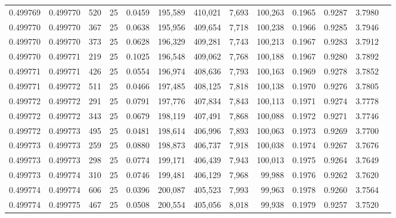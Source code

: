 \begin{tabular}{rrrrrrrrrrrrr}
0.499769 & 0.499770 &   520 &  25 &                                     0.0459 & 195,589 & 410,021 &   7,693 & 100,263 & 0.1965 & 0.9287 & 3.7980 \\
0.499770 & 0.499770 &   367 &  25 &                                     0.0638 & 195,956 & 409,654 &   7,718 & 100,238 & 0.1966 & 0.9285 & 3.7946 \\
0.499770 & 0.499770 &   373 &  25 &                                     0.0628 & 196,329 & 409,281 &   7,743 & 100,213 & 0.1967 & 0.9283 & 3.7912 \\
0.499770 & 0.499771 &   219 &  25 &                                     0.1025 & 196,548 & 409,062 &   7,768 & 100,188 & 0.1967 & 0.9280 & 3.7892 \\
0.499771 & 0.499771 &   426 &  25 &                                     0.0554 & 196,974 & 408,636 &   7,793 & 100,163 & 0.1969 & 0.9278 & 3.7852 \\
0.499771 & 0.499772 &   511 &  25 &                                     0.0466 & 197,485 & 408,125 &   7,818 & 100,138 & 0.1970 & 0.9276 & 3.7805 \\
0.499772 & 0.499772 &   291 &  25 &                                     0.0791 & 197,776 & 407,834 &   7,843 & 100,113 & 0.1971 & 0.9274 & 3.7778 \\
0.499772 & 0.499772 &   343 &  25 &                                     0.0679 & 198,119 & 407,491 &   7,868 & 100,088 & 0.1972 & 0.9271 & 3.7746 \\
0.499772 & 0.499773 &   495 &  25 &                                     0.0481 & 198,614 & 406,996 &   7,893 & 100,063 & 0.1973 & 0.9269 & 3.7700 \\
0.499773 & 0.499773 &   259 &  25 &                                     0.0880 & 198,873 & 406,737 &   7,918 & 100,038 & 0.1974 & 0.9267 & 3.7676 \\
0.499773 & 0.499773 &   298 &  25 &                                     0.0774 & 199,171 & 406,439 &   7,943 & 100,013 & 0.1975 & 0.9264 & 3.7649 \\
0.499773 & 0.499774 &   310 &  25 &                                     0.0746 & 199,481 & 406,129 &   7,968 &  99,988 & 0.1976 & 0.9262 & 3.7620 \\
0.499774 & 0.499774 &   606 &  25 &                                     0.0396 & 200,087 & 405,523 &   7,993 &  99,963 & 0.1978 & 0.9260 & 3.7564 \\
0.499774 & 0.499775 &   467 &  25 &                                     0.0508 & 200,554 & 405,056 &   8,018 &  99,938 & 0.1979 & 0.9257 & 3.7520 \\

\end{tabular}
